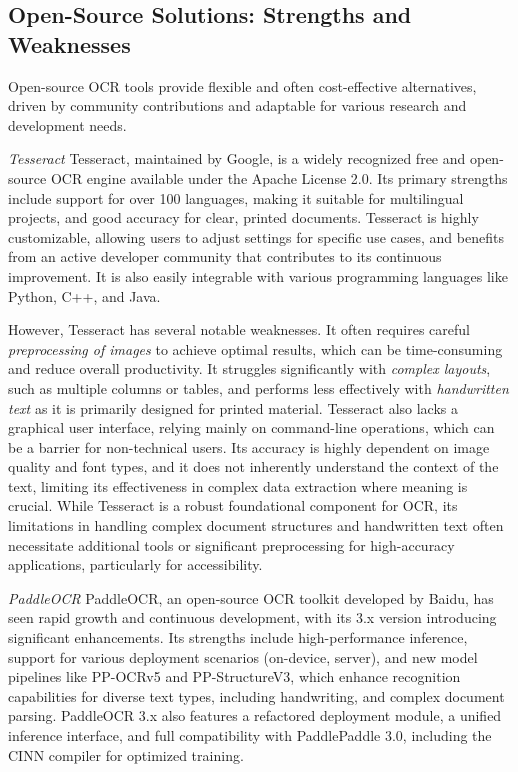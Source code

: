 \subsection{Open-Source Solutions: Strengths and Weaknesses}

Open-source OCR tools provide flexible and often cost-effective alternatives, driven by community contributions and adaptable for various research and development needs.

\emph{Tesseract}
Tesseract, maintained by Google, is a widely recognized free and open-source OCR engine available under the Apache License 2.0. \cite{KoncileTesseract,IronSoftwareTesseract} Its primary strengths include support for over 100 languages, making it suitable for multilingual projects, and good accuracy for clear, printed documents. \cite{KoncileTesseract,IronSoftwareTesseract} Tesseract is highly customizable, allowing users to adjust settings for specific use cases, and benefits from an active developer community that contributes to its continuous improvement. \cite{KoncileTesseract,IronSoftwareTesseract} It is also easily integrable with various programming languages like Python, C++, and Java. \cite{KoncileTesseract,IronSoftwareTesseract}

However, Tesseract has several notable weaknesses. It often requires careful \emph{preprocessing of images} to achieve optimal results, which can be time-consuming and reduce overall productivity. \cite{KoncileTesseract} It struggles significantly with \emph{complex layouts}, such as multiple columns or tables, and performs less effectively with \emph{handwritten text} as it is primarily designed for printed material. \cite{KoncileTesseract} Tesseract also lacks a graphical user interface, relying mainly on command-line operations, which can be a barrier for non-technical users. \cite{KoncileTesseract} Its accuracy is highly dependent on image quality and font types, and it does not inherently understand the context of the text, limiting its effectiveness in complex data extraction where meaning is crucial. \cite{KoncileTesseract} While Tesseract is a robust foundational component for OCR, its limitations in handling complex document structures and handwritten text often necessitate additional tools or significant preprocessing for high-accuracy applications, particularly for accessibility.

\emph{PaddleOCR}
PaddleOCR, an open-source OCR toolkit developed by Baidu, has seen rapid growth and continuous development, with its 3.x version introducing significant enhancements. \cite{PaddleOCR} Its strengths include high-performance inference, support for various deployment scenarios (on-device, server), and new model pipelines like PP-OCRv5 and PP-StructureV3, which enhance recognition capabilities for diverse text types, including handwriting, and complex document parsing. \cite{PaddleOCR} PaddleOCR 3.x also features a refactored deployment module, a unified inference interface, and full compatibility with PaddlePaddle 3.0, including the CINN compiler for optimized training. \cite{PaddleOCR}

